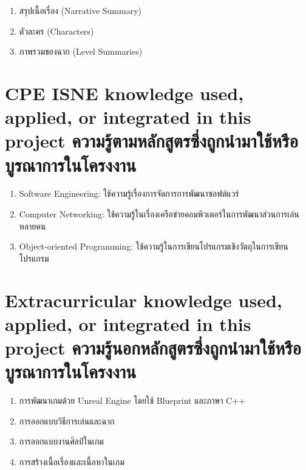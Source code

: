 \begin{enumerate}
  \item สรุปเนื้อเรื่อง (Narrative Summary)
  \item ตัวละคร (Characters)
  \item ภาพรวมของฉาก (Level Summaries)
\end{enumerate}

\section{\ifenglish%
\ifcpe CPE \else ISNE \fi knowledge used, applied, or integrated in this project
\else%
ความรู้ตามหลักสูตรซึ่งถูกนำมาใช้หรือบูรณาการในโครงงาน
\fi
}

\begin{enumerate}
  \item Software Engineering: ใช้ความรู้เรื่องการจัดการการพัฒนาซอฟต์แวร์
  \item Computer Networking: ใช้ความรู้ในเรื่องเครือข่ายคอมพิวเตอร์ในการพัฒนาส่วนการเล่นหลายคน
  \item Object-oriented Programming: ใช้ความรู้ในการเขียนโปรแกรมเชิงวัตถุในการเขียนโปรแกรม
\end{enumerate}


\section{\ifenglish%
Extracurricular knowledge used, applied, or integrated in this project
\else%
ความรู้นอกหลักสูตรซึ่งถูกนำมาใช้หรือบูรณาการในโครงงาน
\fi
}


\begin{enumerate}
  \item การพัฒนาเกมด้วย Unreal Engine โดยใช้ Blueprint และภาษา C++
  \item การออกแบบวิธีการเล่นและฉาก
  \item การออกแบบงานศิลป์ในเกม
  \item การสร้างเนื้อเรื่องและเนื้อหาในเกม
\end{enumerate}
